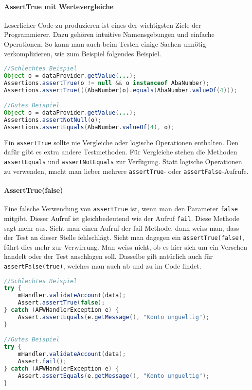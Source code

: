 \paragraph{AssertTrue mit Wertevergleiche}
Leserlicher Code zu produzieren ist eines der wichtigsten Ziele der Programmierer. Dazu gehören intuitive Namensgebungen und einfache Operationen. So kann man auch beim Testen einige Sachen unnötig verkomplizieren, wie zum Beispiel folgendes Beispiel.
\begin{lstlisting}[language=Java, caption={assertTrue falsch eingesetzt \cite{web:abawikijunit5}}]
//Schlechtes Beispiel
Object o = dataProvider.getValue(...);
Assertions.assertTrue(o != null && o instanceof AbaNumber);
Assertions.assertTrue(((AbaNumber)o).equals(AbaNumber.valueOf(4)));

//Gutes Beispiel
Object o = dataProvider.getValue(...);
Assertions.assertNotNull(o);
Assertions.assertEquals(AbaNumber.valueOf(4), o);
\end{lstlisting}
Ein \texttt{assertTrue} sollte nie Vergleiche oder logische Operationen enthalten. Den dafür gibt es extra andere Testmethoden. Für Vergleiche stehen die Methoden \texttt{assertEquals} und \texttt{assertNotEquals} zur Verfügung. Statt logische Operationen zu verwenden, macht man lieber mehrere \texttt{assertTrue}- oder \texttt{assertFalse}-Aufrufe.
\paragraph{AssertTrue(false)}
Eine falsche Verwendung von \texttt{assertTrue} ist, wenn man den Parameter \texttt{false} mitgibt. Dieser Aufruf ist gleichbedeutend wie der Aufruf \texttt{fail}. Diese Methode sagt mehr aus. Sieht man einen Aufruf der fail-Methode, dann weiss man, dass der Test an dieser Stelle fehlschlägt. Sieht man dagegen ein \texttt{assertTrue(false)}, führt dies mehr zur Verwirrung. Man weiss nicht, ob es hier sich um ein Versehen handelt oder der Test anschlagen soll. Dasselbe gilt natürlich auch für \texttt{assertFalse(true)}, welches man auch ab und zu im Code findet.
\begin{lstlisting}[language=Java, caption={assertTrue(false) und fail()}]
//Schlechtes Beispiel
try {
	mHandler.validateAccount(data);
	Assert.assertTrue(false);
} catch (AFWHandlerException e) {
	Assert.assertEquals(e.getMessage(), "Konto ungueltig");
}

//Gutes Beispiel
try {
	mHandler.validateAccount(data);
	Assert.fail();
} catch (AFWHandlerException e) {
	Assert.assertEquals(e.getMessage(), "Konto ungueltig");
}
\end{lstlisting}
